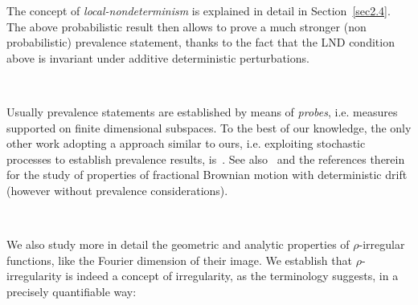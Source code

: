 \documentclass[10pt]{article}
\newcommand{\tmtextit}[1]{{\itshape{#1}}}
\begin{document}
The concept of \tmtextit{local-nondeterminism} is explained in detail in
Section~\ref{sec2.4}. The above probabilistic result then allows to prove a
much stronger (non probabilistic) prevalence statement, thanks to the fact
that the LND condition above is invariant under additive deterministic
perturbations.

\

Usually prevalence statements are established by means of \tmtextit{probes},
i.e. measures supported on finite dimensional subspaces. To the best of our
knowledge, the only other work adopting a approach similar to ours, i.e.
exploiting stochastic processes to establish prevalence results,
is~{\cite{bayart}}. See also~{\cite{peres}} and the references therein for the
study of properties of fractional Brownian motion with deterministic drift
(however without prevalence considerations).

\

We also study more in detail the geometric and analytic properties of
$\rho$-irregular functions, like the Fourier dimension of their image. We
establish that $\rho$-irregularity is indeed a concept of irregularity, as the
terminology suggests, in a precisely quantifiable way:

\

\begin{center}
\end{center}

\
\end{document}
